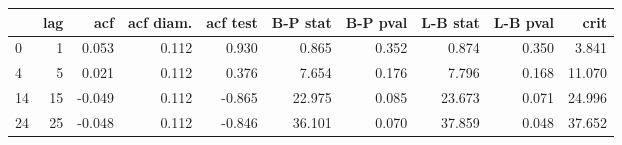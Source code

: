 \begin{tabular}{lrrrrrrrrr}
\toprule
{} &  lag &    acf &  acf diam. &  acf test &  B-P stat &  B-P pval &  L-B stat &  L-B pval &    crit \\
\midrule
0  &    1 &  0.053 &      0.112 &     0.930 &     0.865 &     0.352 &     0.874 &     0.350 &   3.841 \\
4  &    5 &  0.021 &      0.112 &     0.376 &     7.654 &     0.176 &     7.796 &     0.168 &  11.070 \\
14 &   15 & -0.049 &      0.112 &    -0.865 &    22.975 &     0.085 &    23.673 &     0.071 &  24.996 \\
24 &   25 & -0.048 &      0.112 &    -0.846 &    36.101 &     0.070 &    37.859 &     0.048 &  37.652 \\
\bottomrule
\end{tabular}
